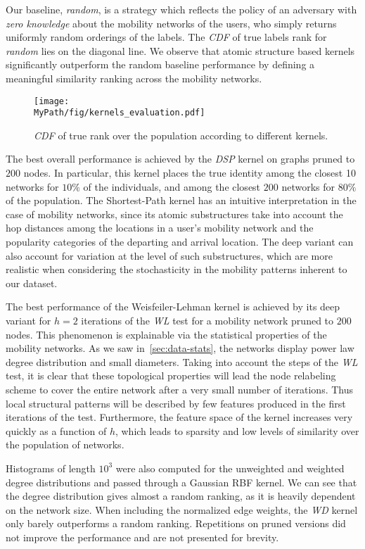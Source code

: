 Our baseline, \emph{random}, is a strategy which reflects the policy of an adversary with \emph{zero knowledge} about the mobility networks of the users, who simply returns uniformly random orderings of the labels.
The \emph{CDF} of true labels rank for \emph{random}  lies on the diagonal line.
We observe that atomic structure based kernels significantly outperform the random baseline performance by defining a meaningful similarity ranking across the mobility networks.

\begin{figure}[!t]
	\centering
	\texttt{[image: \\MyPath/fig/kernels\_evaluation.pdf]}
	\caption{\emph{CDF} of true rank over the population according to different kernels.}
	\label{fig:kernels_evaluation}
\end{figure}

The best overall performance is achieved by the \emph{DSP} kernel on graphs pruned to $ 200 $ nodes.
In particular, this kernel places the true identity among the closest 10 networks for $10\%$ of the individuals, and among the closest $ 200 $ networks for $ 80\%$ of the population.
The Shortest-Path kernel has an intuitive interpretation in the case of mobility networks, since its atomic substructures take into account the hop distances among the locations in a user's mobility network and the popularity categories of the departing and arrival location.
The deep variant can also account for variation at the level of such substructures, which are more realistic when considering the stochasticity in the mobility patterns inherent to our dataset.

The best performance of the Weisfeiler-Lehman kernel is achieved by its deep variant for $ h=2 $ iterations of the \emph{WL} test for a mobility network pruned to $200$ nodes.
This phenomenon is explainable via the statistical properties of the mobility networks.
As we saw in~\cref{sec:data-stats}, the networks display power law degree distribution and small diameters.
Taking into account the steps of the \emph{WL} test, it is clear that these topological properties will lead the node relabeling scheme to cover the entire network after a very small number of iterations.
Thus local structural patterns will be described by few features produced in the first iterations of the test.
Furthermore, the feature space of the kernel increases very quickly as a function of $ h $, which leads to sparsity and low levels of similarity over the population of networks.

Histograms of length $10^3$ were also computed for the unweighted and weighted degree distributions and passed through a Gaussian RBF kernel.
We can see that the degree distribution gives almost a random ranking, as it is heavily dependent on the network size.
When including the normalized edge weights, the \emph{WD} kernel only barely outperforms a rand\label{key}om ranking.
Repetitions on pruned versions did not improve the performance and are not presented for brevity.

